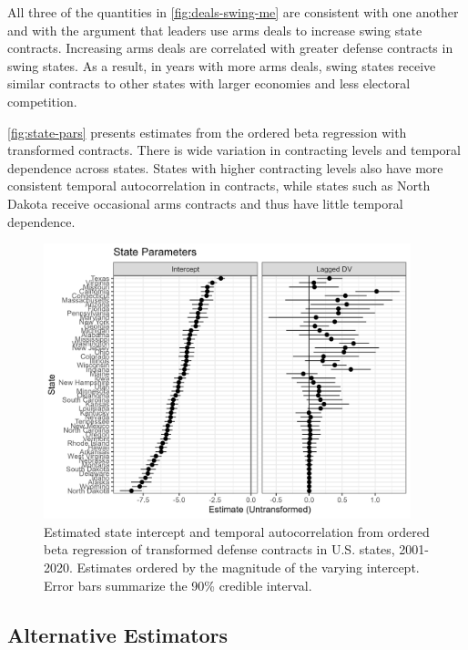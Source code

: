\documentclass[12pt]{article}
\begin{document}
All three of the quantities in  \autoref{fig:deals-swing-me} are consistent with one another and with the argument that leaders use arms deals to increase swing state contracts. 
Increasing arms deals are correlated with greater defense contracts in swing states. 
As a result, in years with more arms deals, swing states receive similar contracts to other states with larger economies and less electoral competition.



\autoref{fig:state-pars} presents estimates from the ordered beta regression with transformed contracts. 
There is wide variation in contracting levels and temporal dependence across states. 
States with higher contracting levels also have more consistent temporal autocorrelation in contracts, while states such as North Dakota receive occasional arms contracts and thus have little temporal dependence. 

\begin{figure}[htpb]
	\centering
		\includegraphics[width=0.95\textwidth]{state-pars.png}
	\caption{Estimated state intercept and temporal autocorrelation from ordered beta regression of transformed defense contracts in U.S. states, 2001-2020. Estimates ordered by the magnitude of the varying intercept. Error bars summarize the 90\% credible interval.}
	\label{fig:state-pars}
\end{figure}


\subsection{Alternative Estimators}
\end{document}
